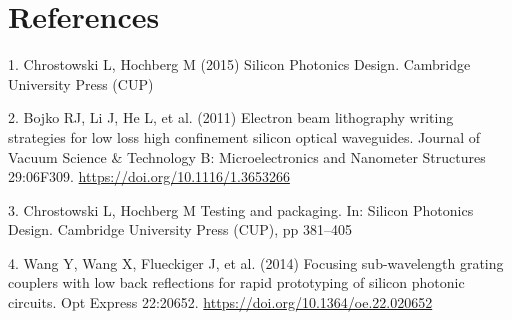 \FloatBarrier
\section*{References}\sloppy
{}
\label{csl:1}1. Chrostowski L, Hochberg M (2015) {Silicon Photonics Design}. Cambridge University Press ({CUP})

\label{csl:2}2. Bojko RJ, Li J, He L, et al. (2011) {Electron beam lithography writing strategies for low loss high confinement silicon optical waveguides}. Journal of Vacuum Science {\&} Technology B: Microelectronics and Nanometer Structures 29:06F309. \url{https://doi.org/10.1116/1.3653266}

\label{csl:3}3. Chrostowski L, Hochberg M {Testing and packaging}. In: Silicon Photonics Design. Cambridge University Press ({CUP}), pp 381–405

\label{csl:4}4. Wang Y, Wang X, Flueckiger J, et al. (2014) {Focusing sub-wavelength grating couplers with low back reflections for rapid prototyping of silicon photonic circuits}. Opt Express 22:20652. \url{https://doi.org/10.1364/oe.22.020652}



